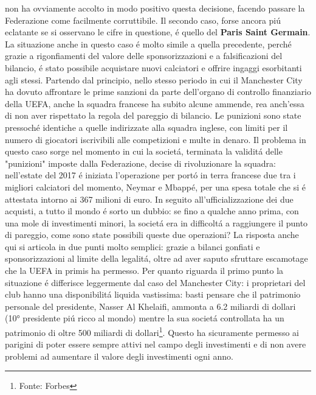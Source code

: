 \documentclass[
    corpo=12pt,
    oneside,
    evenboxes,
    tipotesi=triennale,
    stile=classica,
    oldstyle,
    autoretitolo,
    greek,
]{toptesi}
\begin{document}
\begin{interlinea}{1.5}
non ha ovviamente accolto in modo positivo questa decisione, facendo passare la Federazione come facilmente corruttibile.\newline
Il secondo caso, forse ancora pi\'u eclatante se si osservano le cifre in questione, \'e quello del \textbf{Paris Saint Germain}. 
La situazione anche in questo caso \'e molto simile a quella precedente, perch\'e grazie a rigonfiamenti del valore
delle sponsorizzazioni e a falsificazioni del bilancio, \'e stato possibile acquistare nuovi calciatori e offrire ingaggi esorbitanti agli stessi.
Partendo dal principio, nello stesso periodo in cui il Manchester City ha dovuto affrontare le prime sanzioni da parte dell'organo di controllo
finanziario della UEFA, anche la squadra francese ha subito alcune ammende, rea anch'essa di non aver rispettato la regola del pareggio di bilancio. 
Le punizioni sono state pressoch\'e identiche a quelle indirizzate alla squadra inglese, con limiti per il numero di giocatori iscrivibili alle 
competizioni e multe in denaro. Il problema in questo caso sorge nel momento in cui la societ\'a, terminata la validit\'a delle "punizioni"
imposte dalla Federazione, decise di rivoluzionare la squadra: nell'estate del 2017 \'e iniziata l'operazione per port\'o in terra francese
due tra i migliori calciatori del momento, Neymar e Mbapp\'e, per una spesa totale che si \'e attestata intorno ai 367 
milioni di euro. In seguito all'ufficializzazione dei due acquisti, a tutto il mondo \'e sorto un dubbio: se fino a qualche anno prima,
con una mole di investimenti minori, la societ\'a era in difficolt\'a a raggiungere il punto di pareggio, come sono state possibili queste due 
operazioni? La risposta anche qui si articola in due punti molto semplici: grazie a bilanci gonfiati e sponsorizzazioni al 
limite della legalit\'a, oltre ad aver saputo sfruttare escamotage che la UEFA in primis ha permesso. Per quanto riguarda il primo punto la situazione \'e
differisce leggermente dal caso del Manchester City: i proprietari del club hanno una \linebreak disponibilit\'a liquida vastissima: basti pensare che il patrimonio
personale del \linebreak presidente, Nasser Al Khelaifi, ammonta a 6.2 miliardi di dollari (10° presidente pi\'u ricco al mondo) mentre la sua societ\'a 
controllata ha un patrimonio di oltre 500 miliardi di dollari\footnote{Fonte: Forbes}. Questo ha sicuramente permesso ai parigini
di poter essere sempre attivi nel campo degli investimenti e di non avere problemi ad aumentare il valore degli investimenti ogni anno.

\end{interlinea}
\end{document}
